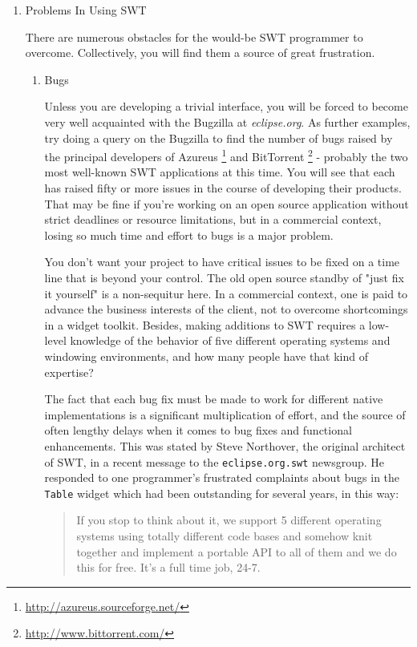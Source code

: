 \documentclass{article}
\begin{document}
\begin{enumerate}
\item Problems In Using SWT
\label{sec:orgheadline291}

There are numerous obstacles for the would-be SWT programmer to
overcome. Collectively, you will find them a source of great
frustration.

\begin{enumerate}
\item Bugs
\label{sec:orgheadline288}

Unless you are developing a trivial interface, you will be forced to
become very well acquainted with the Bugzilla at \emph{eclipse.org}. As
further examples, try doing a query on the Bugzilla to find the number
of bugs raised by the principal developers of Azureus \footnote{\url{http://azureus.sourceforge.net/}} and
BitTorrent \footnote{\url{http://www.bittorrent.com/}} - probably the two most well-known SWT applications at
this time. You will see that each has raised fifty or more issues in the
course of developing their products. That may be fine if you're working
on an open source application without strict deadlines or resource
limitations, but in a commercial context, losing so much time and effort
to bugs is a major problem.

You don't want your project to have critical issues to be fixed on a
time line that is beyond your control. The old open source standby of
"just fix it yourself" is a non-sequitur here. In a commercial context,
one is paid to advance the business interests of the client, not to
overcome shortcomings in a widget toolkit. Besides, making additions to
SWT requires a low-level knowledge of the behavior of five different
operating systems and windowing environments, and how many people have
that kind of expertise?

The fact that each bug fix must be made to work for different native
implementations is a significant multiplication of effort, and the
source of often lengthy delays when it comes to bug fixes and functional
enhancements. This was stated by Steve Northover, the original architect
of SWT, in a recent message to the \texttt{eclipse.org.swt} newsgroup. He
responded to one programmer's frustrated complaints about bugs in the
\texttt{Table} widget which had been outstanding for several years, in this
way:

\begin{quote}
If you stop to think about it, we support 5 different operating
systems using totally different code bases and somehow knit together
and implement a portable API to all of them and we do this for free.
It's a full time job, 24-7.
\end{quote}


\end{enumerate}
\end{enumerate}
\end{document}
